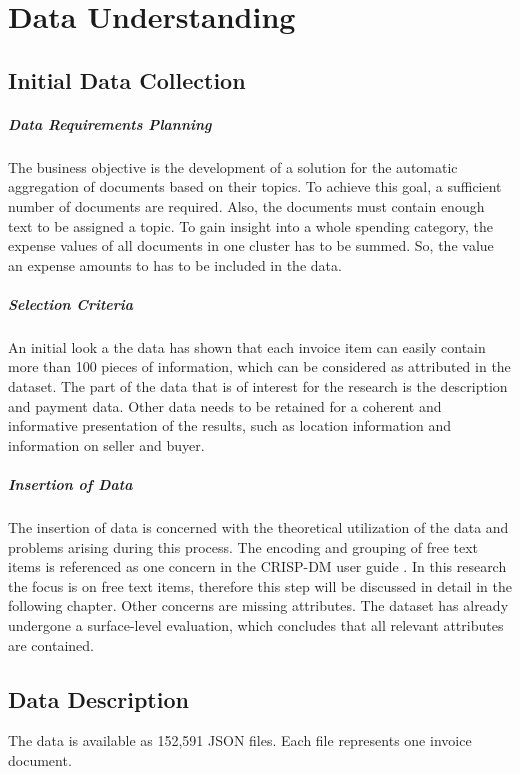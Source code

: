 \chapter{Data Understanding}

\section{Initial Data Collection}

\paragraph{Data Requirements Planning}
The business objective is the development of a solution for the automatic aggregation of documents based on their topics. To achieve this goal, a sufficient number of documents are required. Also, the documents must contain enough text to be assigned a topic. 
To gain insight into a whole spending category, the expense values of all documents in one cluster has to be summed. So, the value an expense amounts to has to be included in the data.

\paragraph{Selection Criteria}
An initial look a the data has shown that each invoice item can easily contain more than 100 pieces of information, which can be considered as attributed in the dataset. The part of the data that is of interest for the research is the description and payment data. Other data needs to be retained for a coherent and informative presentation of the results, such as location information and information on seller and buyer.

\paragraph{Insertion of Data}
The insertion of data is concerned with the theoretical utilization of the data and problems arising during this process. The encoding and grouping of free text items is referenced as one concern in the \ac{CRISP-DM} user guide \cite[p.~44]{CRISPDM2000}. In this research the focus is on free text items, therefore this step will be discussed in detail in the following chapter. 
Other concerns are missing attributes. The dataset has already undergone a surface-level evaluation, which concludes that all relevant attributes are contained.

\section{Data Description}
The data is available as 152,591 \ac{JSON} files. Each file represents one invoice document. 

